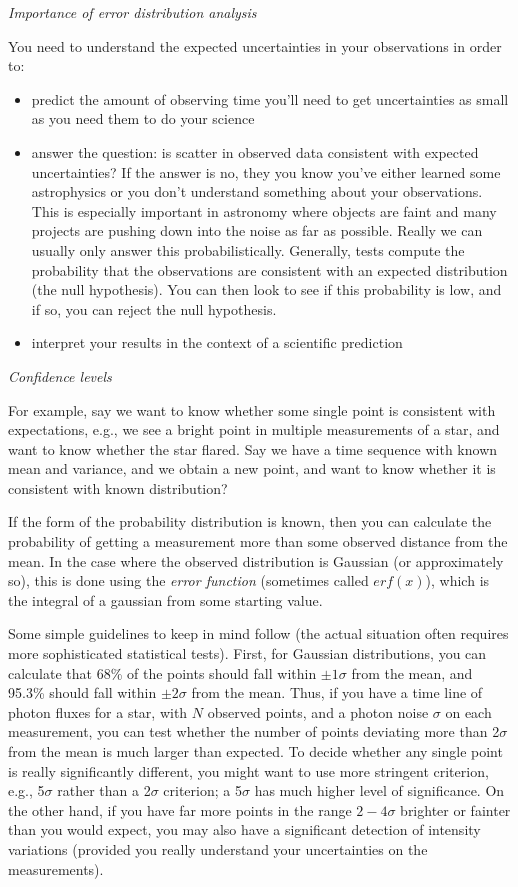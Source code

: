 \documentclass[12pt]{article}
\begin{document}
\emph{Importance of error distribution analysis}

You need to understand the expected uncertainties in your
observations in order to:
\begin{itemize}
    \item predict the amount of observing time you'll need to get
    uncertainties as small as you need them to do your science
    \item answer the question: is scatter in observed data consistent
    with expected uncertainties? If the answer is no, they you know
    you've either learned some astrophysics or you don't understand
    something about your observations. This is especially important in
    astronomy where objects are faint and many projects are pushing
    down into the noise as far as possible. Really we can usually only
    answer this probabilistically. Generally, tests compute the
    probability that the observations are consistent with an expected
    distribution (the null hypothesis). You can then look to see if
    this probability is low, and if so, you can reject the null
    hypothesis.
    \item interpret your results in the context of a scientific
    prediction
\end{itemize}
\emph{Confidence levels}

For example, say we want to know whether some single point
is consistent with expectations, e.g., we see a bright point in
multiple measurements of a star, and want to know whether the star
flared. Say we have a time sequence with known mean and variance, and
we obtain a new point, and want to know whether it is consistent with
known distribution?

If the form of the probability distribution is known, then
you can calculate the probability of getting a measurement more than
some observed distance from the mean. In the case where the observed
distribution is Gaussian (or approximately so), this is done using the
\emph{error function} (sometimes called $erf(x)$), which is the integral of a
gaussian from some starting value.

Some simple guidelines to keep in mind follow (the actual
situation often requires more sophisticated statistical tests). First,
for Gaussian distributions, you can calculate that 68\% of the points
should fall within $\pm 1\sigma$ from the mean, and 95.3\%
should fall within $\pm 2\sigma$ from the mean. Thus, if you have a
time line of photon fluxes for a star, with $N$ observed points, and a
photon noise $\sigma$ on each measurement, you can test whether the
number of points deviating more than 2$\sigma$ from the mean is much
larger than expected. To decide whether any single point is really
significantly different, you might want to use more stringent
criterion, e.g., 5$\sigma$ rather than a 2$\sigma$ criterion;
a 5$\sigma$ has much higher level of significance. On the other hand, if
you have far more points in the range $2-4\sigma$ brighter or
fainter than you would expect, you may also have a significant
detection of intensity variations (provided you really understand your
uncertainties on the measurements).
\end{document}
